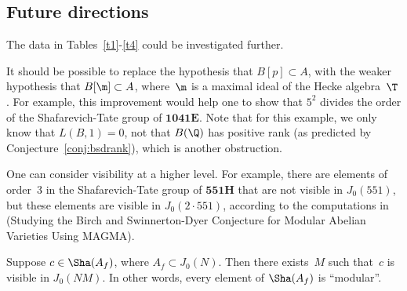 \documentclass{report}
\begin{document}
\subsection{Future directions}
The data in Tables~\ref{t1}-\ref{t4}
could be investigated further.

It should be possible to replace the hypothesis that $B[p]\subset A$,
with the weaker hypothesis that $B[\m]\subset A$, where~$\m$ is a
maximal ideal of the Hecke algebra~$\T$.  For example, this
improvement would help one to show that $5^2$ divides the order of the
Shafarevich-Tate group of $\mathbf{1041E}$.  Note that for this
example, we only know that $L(B,1)=0$, not that $B(\Q)$ has positive
rank (as predicted by Conjecture~\ref{conj:bsdrank}), which is another
obstruction.

One can consider visibility at a higher level.  For example, there are
elements of order~$3$ in the Shafarevich-Tate group of $\mathbf{551H}$
that are not visible in $J_0(551)$, but these elements are visible in
$J_0(2\cdot 551)$, according to the computations in
\cite{stein:bsdmagma} (Studying the Birch and Swinnerton-Dyer
  Conjecture for Modular Abelian Varieties Using MAGMA).
\begin{conjecture}[Stein]
  Suppose $c\in\Sha(A_f)$, where $A_f\subset J_0(N)$.  Then there
  exists~$M$ such that~$c$ is visible in $J_0(NM)$.  In other words,
  every element of $\Sha(A_f)$ is ``modular''.
\end{conjecture}
\end{document}
